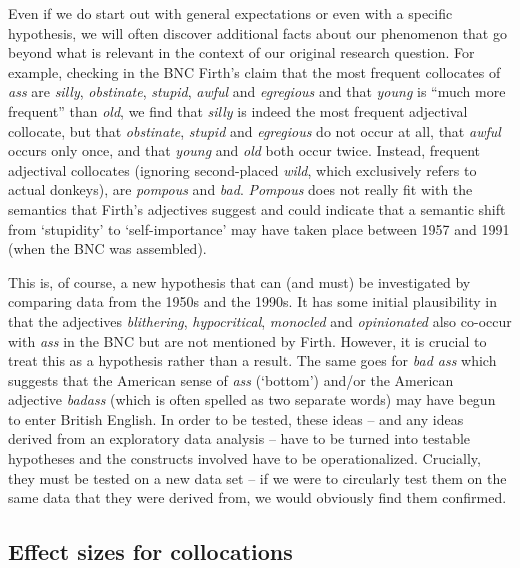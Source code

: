 Even if we do start out with general expectations or even with a specific hypothesis, we will often discover additional facts about our phenomenon that go beyond what is relevant in the context of our original research question. For example, checking in the BNC  Firth's claim that the most frequent collocates  of \textit{ass} are \textit{silly}, \textit{obstinate}, \textit{stupid}, \textit{awful} and \textit{egregious} and that \textit{young} is ``much more frequent''  than \textit{old}, we find that \textit{silly} is indeed the most frequent adjectival  collocate, but that \textit{obstinate}, \textit{stupid} and \textit{egregious} do not occur at all, that \textit{awful} occurs only once, and that \textit{young} and \textit{old} both occur twice. Instead, frequent adjectival  collocates (ignoring second\hyp{}placed \textit{wild}, which exclusively refers to actual donkeys), are \textit{pompous} and \textit{bad}. \textit{Pompous} does not really fit with the semantics  that Firth's adjectives  suggest and could indicate that a semantic shift from `stupidity' to `self\hyp{}importance' may have taken place between 1957 and 1991 (when the BNC  was assembled).

This is, of course, a new hypothesis that can (and must) be investigated by comparing data from the 1950s and the 1990s. It has some initial plausibility in that the adjectives  \textit{blithering}, \textit{hypocritical}, \textit{monocled} and \textit{opinionated} also co\hyp{}occur with \textit{ass} in the BNC  but are not mentioned by Firth. However, it is crucial to treat this as a hypothesis rather than a result. The same goes for \textit{bad ass} which suggests that the American  sense of \textit{ass} (`bottom') and\slash or the American adjective  \textit{badass} (which is often spelled as two separate words) may have begun to enter British  English. In order to be tested, these ideas -- and any ideas derived from an exploratory  data analysis -- have to be turned into testable hypotheses and the constructs involved have to be operationalized.  Crucially, they must be tested on a new data set -- if we were to circularly test them on the same data that they were derived from, we would obviously find them confirmed.

\subsection{Effect sizes for collocations}
\label{sec:effectsizesforcollocations}

